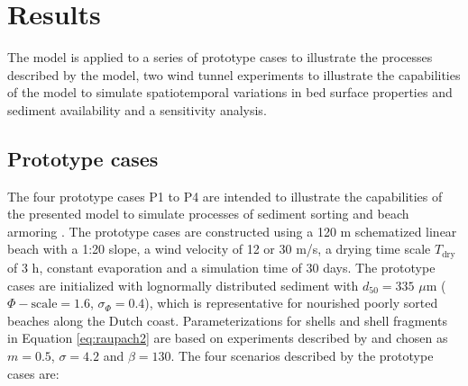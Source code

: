 \section{Results} \label{sec:results}

The model is applied to a series of prototype cases to illustrate the
processes described by the model, two wind tunnel experiments to
illustrate the capabilities of the model to simulate spatiotemporal
variations in bed surface properties and sediment availability and a
sensitivity analysis.

\subsection{Prototype cases} \label{sec:prototype}

The four prototype cases P1 to P4 are intended to illustrate the
capabilities of the presented model to simulate processes of sediment
sorting \citep{VanDerWal2000, Arens2002} and beach armoring
\citep{VanDerWal1998}. The prototype cases are constructed using a 120
m schematized linear beach with a 1:20 slope, a wind velocity of 12 or
30 m/s, a drying time scale $T_{\mathrm{dry}}$ of 3 h, constant
evaporation and a simulation time of 30 days. The prototype cases are
initialized with lognormally distributed sediment with $d_{50} = 335$
$\mu \mathrm{m}$ ($\Phi-\mathrm{scale} = 1.6$, $\sigma_{\Phi} = 0.4$),
which is representative for nourished poorly sorted beaches along the
Dutch coast.  Parameterizations for shells and shell fragments in
Equation \ref{eq:raupach2} are based on experiments described by
\citet{McKennaNeuman2012} and chosen as $m = 0.5$, $\sigma = 4.2$ and
$\beta = 130$. The four scenarios described by the prototype cases
are:

